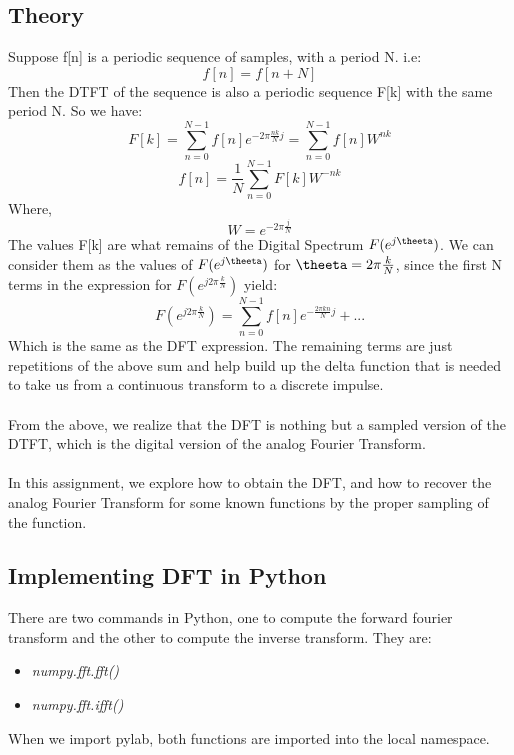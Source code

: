 \documentclass[11pt]{article}
\begin{document}
\subsection{Theory}
Suppose f[n] is a periodic sequence of samples, with a period N. i.e:
\begin{equation}
    f[n] = f[n+N]
\end{equation}
Then the DTFT of the sequence is also a periodic sequence F[k] with the same period N. So we have:
\begin{equation}
    F[k] = \sum_{n=0}^{N-1}f[n]e^{-2\pi \frac{nk}{N} j} = \sum_{n=0}^{N-1}f[n]W^{nk}
\end{equation}
\begin{equation}
    f[n] = \frac{1}{N} \sum_{n=0}^{N-1} F[k]W^{-nk}
\end{equation}
Where,
\begin{equation}
    W = e^{-2\pi\frac{j}{N}}
\end{equation}
The values F[k] are what remains of the Digital Spectrum $F(e^{j\theeta})$. We can consider them as the values of $F(e^{j\theeta})$ for $\theeta = 2\pi \frac{k}{N}$,  since the first N terms in the expression for $F(e^{j2\pi \frac{k}{N}})$ yield:
\begin{equation}
    F(e^{j2\pi \frac{k}{N}}) = \sum_{n=0}^{N-1}f[n]e^{-\frac{2\pi kn}{N}j} + ...
\end{equation}
Which is the same as the DFT expression. The remaining terms are just repetitions of the above sum and help build up the delta function that is needed to take us from a continuous transform to a discrete impulse.\\~\\
From the above, we realize that the DFT is nothing but  a sampled version of the DTFT, which is the digital version of the analog Fourier Transform.\\~\\
In this assignment, we explore how to obtain the DFT, and how to recover the
analog Fourier Transform for some known functions by the proper sampling of the function.




\subsection{Implementing DFT in Python}
There are two commands in Python, one to compute the forward fourier transform and the other to compute the inverse transform. They are:
\begin{itemize}
    \item \textit{numpy.fft.fft()}
    \item \textit{numpy.fft.ifft()}
\end{itemize}
When we import pylab, both functions are imported into the local namespace.
\end{document}
